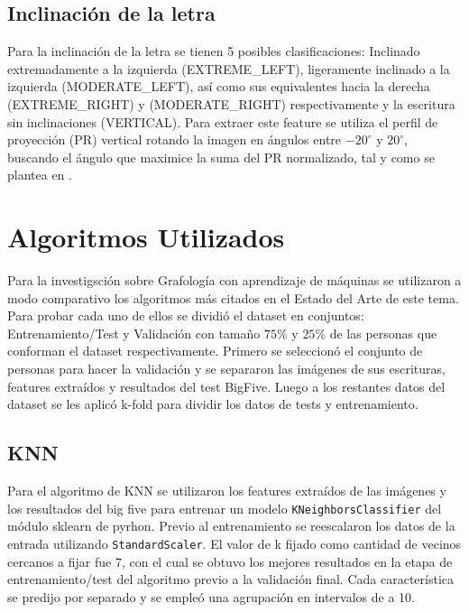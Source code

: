 \documentclass[10pt, a4paper]{article}
\begin{document}
        \subsection{Inclinaci\'on de la letra}
            Para la inclinaci\'on de la letra se tienen 5 posibles clasificaciones: Inclinado extremadamente a la izquierda (EXTREME\_LEFT), ligeramente inclinado a la 
            izquierda (MODERATE\_LEFT), as\'i como sus equivalentes hacia la derecha (EXTREME\_RIGHT) y (MODERATE\_RIGHT) respectivamente y la escritura sin inclinaciones (VERTICAL). 
            Para extraer este feature se utiliza el perfil de proyecci\'on (PR) vertical rotando la imagen en \'angulos entre $-20^{\circ}$ y $20^{\circ}$, buscando el \'angulo que maximice
            la suma del PR normalizado, tal y como se plantea en \cite{20}.

    \section{Algoritmos Utilizados}
        Para la investigsci\'on sobre Grafolog\'ia con aprendizaje de m\'aquinas se utilizaron a modo comparativo los algoritmos m\'as citados en el Estado del Arte de este tema. 
        Para probar cada uno de ellos se dividi\'o el dataset en  conjuntos: Entrenamiento/Test y Validaci\'on con tama\~no $75\%$ y $25\%$ de las personas que conforman el dataset respectivamente.
        Primero se seleccion\'o el conjunto de personas para hacer la validaci\'on y se separaron las im\'agenes de sus escrituras, features extra\'idos y resultados del test BigFive. Luego a los restantes datos del dataset 
        se les aplic\'o k-fold para dividir los datos de tests y entrenamiento.  
        
        \subsection{KNN}
            Para el algoritmo de KNN se utilizaron los features extra\'idos de las im\'agenes y los resultados del big five para entrenar un modelo \texttt{KNeighborsClassifier} del m\'odulo sklearn de pyrhon. 
            Previo al entrenamiento se reescalaron los datos de la entrada utilizando \texttt{StandardScaler}. El valor de k fijado como cantidad de vecinos cercanos a fijar fue 7, con el cual se obtuvo los mejores resultados en 
            la etapa de entrenamiento/test del algoritmo previo a la validaci\'on final. Cada caracter\'istica se predijo por separado y se emple\'o una agrupaci\'on en intervalos de a 10.
        
\end{document}
